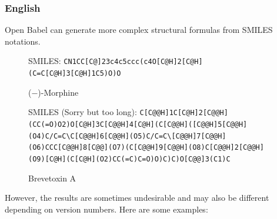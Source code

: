 \documentclass[12pt]{ltjsarticle}
\begin{document}
\subsubsection{English}

Open Babel can generate more complex structural formulas from SMILES notations.

\begin{figure}[ht]
  \centering
  \caption{($-$)-Morphine}
  SMILES: \verb|CN1CC[C@]23c4c5ccc(c4O[C@H]2[C@H](C=C[C@H]3[C@H]1C5)O)O|
\end{figure}

\begin{figure}[ht]
  \centering
  \smilesobabel[width=150mm]{C[C@@H]1C[C@H]2[C@@H](CC(=O)O2)O[C@H]3C[C@@H]4[C@H](C[C@@H]([C@@H]5[C@@H](O4)C/C=C\C[C@@H]6[C@@H](O5)C/C=C\[C@@H]7[C@@H](O6)CCC[C@@H]8[C@@](O7)(C[C@@H]9[C@@H](O8)C[C@@H]2[C@@H](O9)[C@H](C[C@H](O2)CC(=C)C=O)O)C)C)O[C@@]3(C1)C}{}
  \caption{Brevetoxin A}
  SMILES (Sorry but too long): \verb|C[C@@H]1C[C@H]2[C@@H](CC(=O)O2)O[C@H]3C[C@@H]4[C@H](C[C@@H]([C@@H]5[C@@H](O4)C/C=C\C[C@@H]6[C@@H](O5)C/C=C\[C@@H]7[C@@H](O6)CCC[C@@H]8[C@@](O7)(C[C@@H]9[C@@H](O8)C[C@@H]2[C@@H](O9)[C@H](C[C@H](O2)CC(=C)C=O)O)C)C)O[C@@]3(C1)C|
\end{figure}

However, the results are sometimes undesirable and may also be
different depending on version numbers.
Here are some examples:

\clearpage
\end{document}
